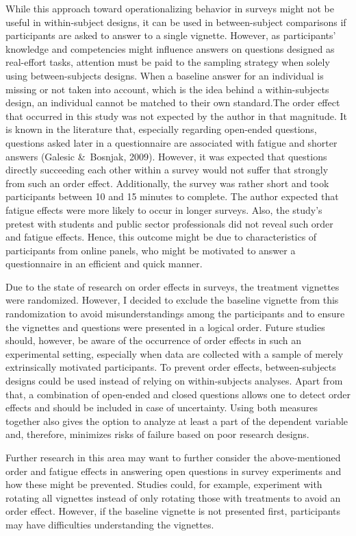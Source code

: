 \documentclass{article}
\begin{document}
While this approach toward operationalizing behavior in surveys might not be useful in within-subject designs, it can be used in between-subject comparisons if participants are asked to answer to a single vignette. However, as participants' knowledge and competencies might influence answers on questions designed as real-effort tasks, attention must be paid to the sampling strategy when solely using between-subjects designs. When a baseline answer for an individual is missing or not taken into account, which is the idea behind a within-subjects design, an individual cannot be matched to their own standard.The order effect that occurred in this study was not expected by the author in that magnitude. It is known in the literature that, especially regarding open-ended questions, questions asked later in a questionnaire are associated with fatigue and shorter answers (Galesic \& Bosnjak, 2009). However, it was expected that questions directly succeeding each other within a survey would not suffer that strongly from such an order effect. Additionally, the survey was rather short and took participants between 10 and 15 minutes to complete. The author expected that fatigue effects were more likely to occur in longer surveys. Also, the study's pretest with students and public sector professionals did not reveal such order and fatigue effects. Hence, this outcome might be due to characteristics of participants from online panels, who might be motivated to answer a questionnaire in an efficient and quick manner. 

Due to the state of research on order effects in surveys, the treatment vignettes were randomized. However, I decided to exclude the baseline vignette from this randomization to avoid misunderstandings among the participants and to ensure the vignettes and questions were presented in a logical order. Future studies should, however, be aware of the occurrence of order effects in such an experimental setting, especially when data are collected with a sample of merely extrinsically motivated participants. To prevent order effects, between-subjects designs could be used instead of relying on within-subjects analyses. Apart from that, a combination of open-ended and closed questions allows one to detect order effects and should be included in case of uncertainty. Using both measures together also gives the option to analyze at least a part of the dependent variable and, therefore, minimizes risks of failure based on poor research designs. 

Further research in this area may want to further consider the above-mentioned order and fatigue effects in answering open questions in survey experiments and how these might be prevented. Studies could, for example, experiment with rotating all vignettes instead of only rotating those with treatments to avoid an order effect. However, if the baseline vignette is not presented first, participants may have difficulties understanding the vignettes.
\end{document}

